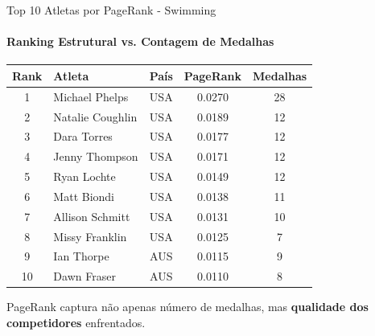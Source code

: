 \begin{frame}{Top 10 Atletas por PageRank - Swimming}
    \framesubtitle{Ranking Estrutural vs. Contagem de Medalhas}
    \begin{table}[h]
        \centering
        \footnotesize
        \begin{tabular}{clccc}
            \toprule
            \textbf{Rank} & \textbf{Atleta} & \textbf{País} & \textbf{PageRank} & \textbf{Medalhas} \\
            \midrule
            1 & Michael Phelps & USA & 0.0270 & 28 \\
            2 & Natalie Coughlin & USA & 0.0189 & 12 \\
            3 & Dara Torres & USA & 0.0177 & 12 \\
            4 & Jenny Thompson & USA & 0.0171 & 12 \\
            5 & Ryan Lochte & USA & 0.0149 & 12 \\
            6 & Matt Biondi & USA & 0.0138 & 11 \\
            7 & Allison Schmitt & USA & 0.0131 & 10 \\
            8 & Missy Franklin & USA & 0.0125 & 7 \\
            9 & Ian Thorpe & AUS & 0.0115 & 9 \\
            10 & Dawn Fraser & AUS & 0.0110 & 8 \\
            \bottomrule
        \end{tabular}
    \end{table}
    \vspace{-0.3cm}
    \begin{block}{}
        \footnotesize
        PageRank captura não apenas número de medalhas, mas \textbf{qualidade dos competidores} enfrentados.
    \end{block}
\end{frame}

